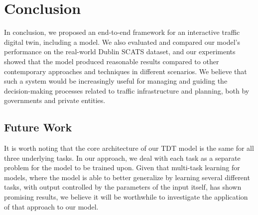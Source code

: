 \section{Conclusion}\label{sec:conclusion}
In conclusion, we proposed an end-to-end framework for an interactive traffic digital twin, including a model. We also evaluated and compared our model's performance on the real-world Dublin SCATS dataset, and our experiments showed that the model produced reasonable results compared to other contemporary approaches and techniques in different scenarios. We believe that such a system would be increasingly useful for managing and guiding the decision-making processes related to traffic infrastructure and planning, both by governments and private entities.



\subsection*{Future Work}
It is worth noting that the core architecture of our TDT model is the same for all three underlying tasks. In our approach, we deal with each task as a separate problem for the model to be trained upon. Given that multi-task learning for models, where the model is able to better generalize by learning several different tasks, with output controlled by the parameters of the input itself, has shown promising results, we believe it will be worthwhile to investigate the application of that approach to our model.
